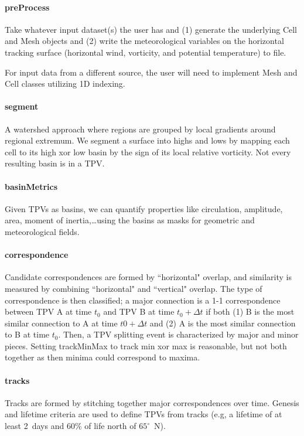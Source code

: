 \documentclass[a4paper]{article}
\begin{document}
\paragraph{preProcess} Take whatever input dataset(s) the user has and (1) generate the underlying Cell and Mesh objects and (2) write the meteorological variables on the horizontal tracking surface (horizontal wind, vorticity, and potential temperature) to file.

For input data from a different source, the user will need to implement Mesh and Cell classes utilizing 1D indexing.

\paragraph{segment} A watershed approach where regions are grouped by local gradients around regional extremum. We segment a surface into highs and lows by mapping each cell to its high xor low basin by the sign of its local relative vorticity. Not every resulting basin is in a TPV.

\paragraph{basinMetrics} Given TPVs as basins, we can quantify properties like circulation, amplitude, area, moment of inertia,\dots using the basins as masks for geometric and meteorological fields.

\paragraph{correspondence} Candidate correspondences are formed by ``horizontal" overlap, and similarity is measured by combining ``horizontal" and ``vertical" overlap. The type of correspondence is then classified; a major connection is a 1-1 correspondence between TPV A at time $t_0$ and TPV B at time $t_0+\Delta t$ if both (1) B is the most similar connection to A at time $t0+\Delta t$ and (2) A is the most similar connection to B at time $t_0$. Then, a TPV splitting event is characterized by major and minor pieces. Setting trackMinMax to track min xor max is reasonable, but not both together as then minima could correspond to maxima.

\paragraph{tracks} Tracks are formed by stitching together major correspondences over time. Genesis and lifetime criteria are used to define TPVs from tracks (e.g, a lifetime of at least 2~days and 60\% of life north of $65^{\circ}$~N).
\end{document}
